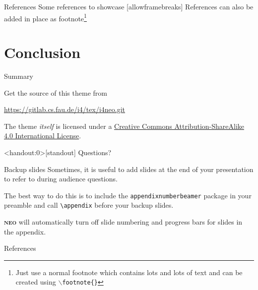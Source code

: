 \documentclass[10pt]{beamer}
\newcommand{\themename}{\textbf{\textsc{neo}}\xspace}
\begin{document}
\begin{frame}{References}
  Some references to showcase [allowframebreaks] \cite{knuth92,ConcreteMath,Simpson,Er01,greenwade93}
  References can also be added in place as footnote\footnote{Just use a normal footnote which contains lots and lots of text and can be created using \texttt{$\backslash$footnote\{\}}}
\end{frame}

\section{Conclusion}

\begin{frame}{Summary}

  Get the source of this theme from

  \begin{center}\url{https://gitlab.cs.fau.de/i4/tex/i4neo.git}\end{center}

  The theme \emph{itself} is licensed under a
  \href{http://creativecommons.org/licenses/by-sa/4.0/}{Creative Commons
  Attribution-ShareAlike 4.0 International License}.

  \begin{center}\ccbysa\end{center}

\end{frame}

\begin{frame}<handout:0>[standout]
  Questions?
\end{frame}

\appendix

\begin{frame}[fragile]{Backup slides}
  Sometimes, it is useful to add slides at the end of your presentation to
  refer to during audience questions.

  The best way to do this is to include the \verb|appendixnumberbeamer|
  package in your preamble and call \verb|\appendix| before your backup slides.

  \themename will automatically turn off slide numbering and progress bars for
  slides in the appendix.
\end{frame}

\begin{frame}[allowframebreaks]{References}

  
  

\end{frame}
\end{document}
